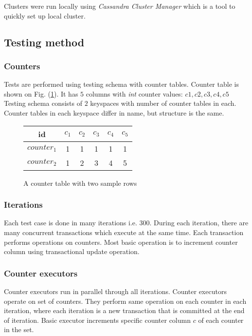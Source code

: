 Clusters were run locally using \emph{Cassandra Cluster Manager} which is a tool to quickly set up local cluster.

\subsection{Testing method}

\subsubsection{Counters}
Tests are performed using testing schema with counter tables. Counter table is shown on Fig. (\ref{fig:counterTable}). It has $5$ columns with \emph{int} counter values: $c1,c2,c3,c4,c5$
Testing schema consists of $2$ keyspaces with number of counter tables in each. Counter tables in each keyspace differ in name, but structure is the same.

\begin{figure}[h]
\centering
\begin{tabular}{c||c|c|c|c|c}
        \toprule
        id 		 & $c_{1}$ & $c_{2}$ & $c_{3}$ & $c_{4}$ & $c_{5}$ \\ \midrule
        $counter_{1}$ & 1  & 1  & 1  &  1 & 1  \\
        $counter_{2}$ & 1  & 2  & 3  &  4 & 5  \\ \bottomrule
      \end{tabular}
      \caption{A counter table with two sample rows}
  \label{fig:counterTable}
\end{figure}

\subsubsection{Iterations}
Each test case is done in many iterations i.e. $300$. During each iteration, there are many concurrent transactions which execute at the same time. Each transaction performs operations on counters. Most basic operation is to increment counter column using transactional update operation.

\subsubsection{Counter executors}
Counter executors run in parallel through all iterations. 
Counter executors operate on set of counters. They perform same operation on each counter in each iteration, where each iteration is a new transaction that is committed at the end of iteration. 
Basic executor increments specific counter column $c$ of each counter in the set.

